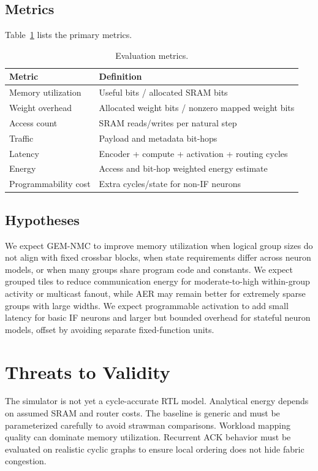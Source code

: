 \documentclass[10pt,conference]{IEEEtran}
\newcommand{\arch}{GEM-NMC}
\begin{document}
\subsection{Metrics}
Table~\ref{tab:metrics} lists the primary metrics.
\begin{table}[t]
\centering
\caption{Evaluation metrics.}
\label{tab:metrics}
\begin{tabular}{ll}
\toprule
Metric & Definition \\
\midrule
Memory utilization & Useful bits / allocated SRAM bits \\
Weight overhead & Allocated weight bits / nonzero mapped weight bits \\
Access count & SRAM reads/writes per natural step \\
Traffic & Payload and metadata bit-hops \\
Latency & Encoder + compute + activation + routing cycles \\
Energy & Access and bit-hop weighted energy estimate \\
Programmability cost & Extra cycles/state for non-IF neurons \\
\bottomrule
\end{tabular}
\end{table}

\subsection{Hypotheses}
We expect \arch{} to improve memory utilization when logical group sizes do not align with fixed crossbar blocks, when state requirements differ across neuron models, or when many groups share program code and constants. We expect grouped tiles to reduce communication energy for moderate-to-high within-group activity or multicast fanout, while AER may remain better for extremely sparse groups with large widths. We expect programmable activation to add small latency for basic IF neurons and larger but bounded overhead for stateful neuron models, offset by avoiding separate fixed-function units.

\section{Threats to Validity}
The simulator is not yet a cycle-accurate RTL model. Analytical energy depends on assumed SRAM and router costs. The baseline is generic and must be parameterized carefully to avoid strawman comparisons. Workload mapping quality can dominate memory utilization. Recurrent ACK behavior must be evaluated on realistic cyclic graphs to ensure local ordering does not hide fabric congestion.
\end{document}

